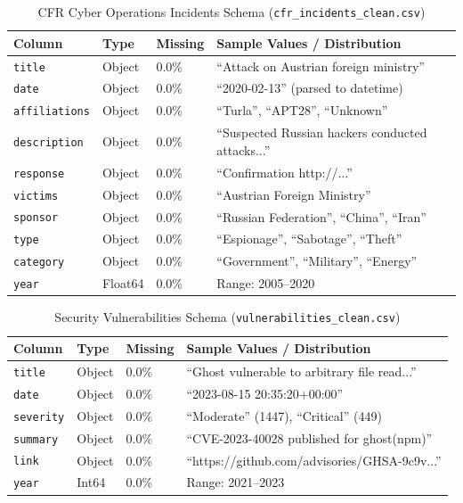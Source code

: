 \documentclass[a4paper, 12pt]{report}
\begin{document}
\begin{table}[h!]
\centering
\small
\caption{CFR Cyber Operations Incidents Schema (\texttt{cfr\_incidents\_clean.csv})}
\begin{tabular}{lllp{6.5cm}}
\toprule
\textbf{Column} & \textbf{Type} & \textbf{Missing} & \textbf{Sample Values / Distribution} \\
\midrule
\texttt{title} & Object & 0.0\% & ``Attack on Austrian foreign ministry'' \\
\texttt{date} & Object & 0.0\% & ``2020-02-13'' (parsed to datetime) \\
\texttt{affiliations} & Object & 0.0\% & ``Turla'', ``APT28'', ``Unknown'' \\
\texttt{description} & Object & 0.0\% & ``Suspected Russian hackers conducted attacks...'' \\
\texttt{response} & Object & 0.0\% & ``Confirmation http://...'' \\
\texttt{victims} & Object & 0.0\% & ``Austrian Foreign Ministry'' \\
\texttt{sponsor} & Object & 0.0\% & ``Russian Federation'', ``China'', ``Iran'' \\
\texttt{type} & Object & 0.0\% & ``Espionage'', ``Sabotage'', ``Theft'' \\
\texttt{category} & Object & 0.0\% & ``Government'', ``Military'', ``Energy'' \\
\texttt{year} & Float64 & 0.0\% & Range: 2005--2020 \\
\bottomrule
\end{tabular}
\end{table}

\begin{table}[h!]
\centering
\small
\caption{Security Vulnerabilities Schema (\texttt{vulnerabilities\_clean.csv})}
\begin{tabular}{lllp{7cm}}
\toprule
\textbf{Column} & \textbf{Type} & \textbf{Missing} & \textbf{Sample Values / Distribution} \\
\midrule
\texttt{title} & Object & 0.0\% & ``Ghost vulnerable to arbitrary file read...'' \\
\texttt{date} & Object & 0.0\% & ``2023-08-15 20:35:20+00:00'' \\
\texttt{severity} & Object & 0.0\% & ``Moderate'' (1447), ``Critical'' (449) \\
\texttt{summary} & Object & 0.0\% & ``CVE-2023-40028 published for ghost(npm)'' \\
\texttt{link} & Object & 0.0\% & ``https://github.com/advisories/GHSA-9c9v...'' \\
\texttt{year} & Int64 & 0.0\% & Range: 2021--2023 \\
\bottomrule
\end{tabular}
\end{table}
\end{document}
